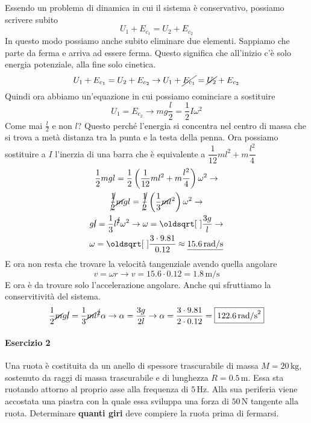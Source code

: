 Essendo un problema di dinamica in cui il sistema è conservativo, possiamo scrivere subito
\begin{equation*}
U_1 + E_{c_1} = U_2 + E_{c_2}
\end{equation*}
In questo modo possiamo anche subito eliminare due elementi. Sappiamo che parte da ferma e arriva ad
essere ferma. Questo significa che all'inizio c'è solo energia potenziale, alla fine solo cinetica.
\begin{equation*}
U_1 + E_{c_1} = U_2 + E_{c_2} \rightarrow U_1 + \cancel{E_{c_1}} = \cancel{U_2} + E_{c_2}
\end{equation*}
Quindi ora abbiamo un'equazione in cui possiamo cominciare a sostituire
\begin{equation*}
U_1 = E_{c_2} \rightarrow mg\frac{l}{2} = \frac{1}{2}I\omega^2
\end{equation*}
Come mai $\frac{l}{2}$ e non $l$? Questo perché l'energia si concentra nel centro di massa che si 
trova a metà distanza tra la punta e la testa della penna. Ora possiamo sostituire a $I$ l'inerzia
di una barra che è equivalente a $\dfrac{1}{12}ml^2 + m\dfrac{l^2}{4}$
\begin{gather*}
\frac{1}{2}mgl = \frac{1}{2}\left(\frac{1}{12}ml^2 + m\frac{l^2}{4}\right)\omega^2 \rightarrow\\
\cancel{\frac{1}{2}}\cancel{m}gl = \cancel{\frac{1}{2}}\left(\frac{1}{3}\cancel{m}l^2\right)\omega^2 
\rightarrow\\
g\cancel{l} = \frac{1}{3}l^{\cancel{2}}\omega^2 \rightarrow \omega = \sqrt{\frac{3g}{l}} \rightarrow\\
\omega = \sqrt{\frac{3\cdot9.81}{0.12}} \approx \underline{15.6\,\text{rad/s}}
\end{gather*}
E ora non resta che trovare la velocità tangenziale avendo quella angolare
\begin{equation*}
v = \omega r \rightarrow v = 15.6\cdot0.12 = \boxed{1.8\,\text{m/s}}
\end{equation*}
E ora è da trovare solo l'accelerazione angolare. Anche qui sfruttiamo la conservitività del sistema.
\begin{equation*}
\frac{1}{2}\cancel{m}g\cancel{l} = \frac{1}{3}\cancel{m}l^{\cancel{2}}\alpha \rightarrow
\alpha = \frac{3g}{2l} \rightarrow \alpha = \frac{3\cdot9.81}{2\cdot0.12} = 
\boxed{122.6\,\text{rad/s}^2}
\end{equation*}

\paragraph{Esercizio 2}
Una ruota è costituita da un anello di spessore trascurabile di massa $M=20\,\text{kg}$, sostenuto da 
raggi di massa trascurabile e di lunghezza $R = 0.5\,\text{m}$. Essa sta ruotando attorno al proprio
asse alla frequenza di $5\,\text{Hz}$. Alla sua periferia viene accostata una piastra con la quale 
essa sviluppa una forza di $50\,\text{N}$ tangente alla ruota. Determinare \textbf{quanti giri} deve 
compiere la ruota prima di fermarsi.
\divisor


